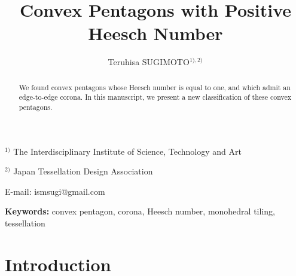 \documentclass[11pt, a4paper]{article}
\begin{document}
\title{Convex Pentagons with Positive Heesch Number}
\author{ Teruhisa SUGIMOTO$^{ 1), 2)}$ }
\date{}
\maketitle



{\footnotesize

\begin{center}
$^{1)}$ The Interdisciplinary Institute of Science, Technology and Art

$^{2)}$ Japan Tessellation Design Association

E-mail: ismsugi@gmail.com
\end{center}

}


\medskip

{\small
\begin{abstract}
\noindent
We found convex pentagons whose Heesch number is equal to 
one, and which admit an edge-to-edge corona. In this manuscript, we present 
a new classification of these convex pentagons.
\end{abstract}



\textbf{Keywords: }convex pentagon, corona, 
Heesch number, monohedral tiling, tessellation

}






\section{Introduction}
\label{section1}
\end{document}
